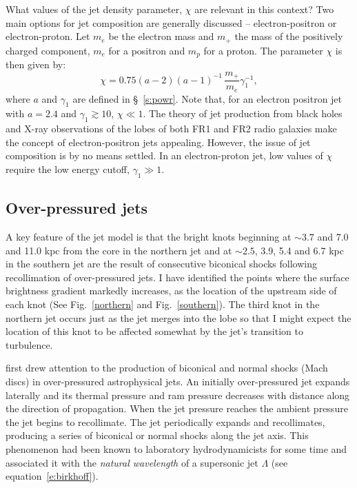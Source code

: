  
What values of the jet density parameter, $\chi$ are relevant in this context? Two main options for jet composition are generally discussed -- electron-positron or electron-proton. Let $m_e$ be the electron mass and $m_+$ the mass of the positively charged component, $m_e$ for a positron and $m_p$ for a proton. The parameter $\chi$ is then given by: 
\begin{equation}
\chi = 0.75(a-2)(a-1)^{-1} \, \frac {m_+}{m_e} \gamma_1^{-1},
\end{equation}
where $a$ and $\gamma_1$ are defined in \S~\ref{s:powr}. Note that, for an electron positron jet with $a=2.4$ and $\gamma_1 \gtrsim 10$, $\chi \ll 1$. The theory of jet production from black holes \citep{blandford77a} and X-ray observations of the lobes of both FR1 and FR2 radio galaxies \citep{croston05a,croston14} make the concept of electron-positron jets appealing. However, the issue of jet composition is by no means settled. In an electron-proton jet, low values of $\chi$ require the low energy cutoff, $\gamma_1 \gg 1$. 


\subsection{Over-pressured jets}\label{s:opj}

A key feature of the jet model is that the bright knots beginning at $\sim3.7$ and 7.0 and 11.0 kpc from the core in the northern jet and at $\sim 2.5$, 3.9, 5.4 and 6.7 kpc in the southern jet are the result of  consecutive biconical shocks following recollimation of over-pressured jets. I have identified the points where the surface brightness gradient markedly increases, as the location of the upstream side of each knot (See Fig.~\ref{northern} and Fig.~\ref{southern}). The third knot in the northern jet occurs just as the jet merges into the lobe so that I might expect the location of this knot to be affected somewhat by the jet's transition to turbulence.  

\citet{norman82} first drew attention to the production of biconical and normal shocks (Mach discs) in over-pressured astrophysical jets. An initially over-pressured jet expands laterally and its thermal pressure and ram pressure decreases with distance along the direction of propagation. When the jet pressure reaches the ambient pressure the jet begins to recollimate. The jet periodically expands and recollimates, producing a series of biconical or normal shocks along the jet axis. This phenomenon had been known to laboratory hydrodynamicists for some time and \citet{birkhoff57a} associated it with the \emph{natural wavelength} of a supersonic jet $\Lambda$ (see equation~\ref{e:birkhoff}). 

